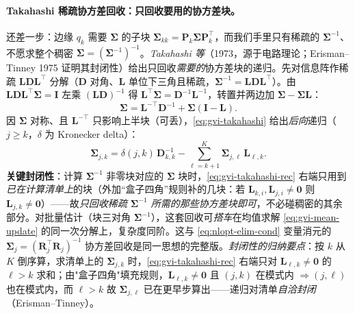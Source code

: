 \paragraph{Takahashi 稀疏协方差回收：只回收要用的协方差块。}
还差一步：边缘 $q_k$ 需要 $\boldsymbol{\Sigma}$ 的子块 $\boldsymbol{\Sigma}_{kk}=\mathbf{P}_k\boldsymbol{\Sigma}\mathbf{P}_k^\top$，而我们手里只有稀疏的 $\boldsymbol{\Sigma}^{-1}$、不愿求整个稠密 $\boldsymbol{\Sigma}=(\boldsymbol{\Sigma}^{-1})^{-1}$。\emph{Takahashi 等}（1973，源于电路理论；Erisman--Tinney 1975 证明其封闭性）给出只回收\emph{需要的}协方差块的递归。先对信息阵作稀疏 $\mathbf{L}\mathbf{D}\mathbf{L}^\top$ 分解（$\mathbf{D}$ 对角、$\mathbf{L}$ 单位下三角且稀疏，$\boldsymbol{\Sigma}^{-1}=\mathbf{L}\mathbf{D}\mathbf{L}^\top$）。由 $\mathbf{L}\mathbf{D}\mathbf{L}^\top\boldsymbol{\Sigma}=\mathbf{I}$ 左乘 $(\mathbf{L}\mathbf{D})^{-1}$ 得 $\mathbf{L}^\top\boldsymbol{\Sigma}=\mathbf{D}^{-1}\mathbf{L}^{-1}$，转置并两边加 $\boldsymbol{\Sigma}-\boldsymbol{\Sigma}\mathbf{L}$：
\begin{equation}
  \boldsymbol{\Sigma}=\mathbf{L}^{-\top}\mathbf{D}^{-1}+\boldsymbol{\Sigma}(\mathbf{I}-\mathbf{L}).
  \label{eq:gvi-takahashi}
\end{equation}
因 $\boldsymbol{\Sigma}$ 对称、且 $\mathbf{L}^{-\top}$ 只影响上半块（可丢），\cref{eq:gvi-takahashi} 给出\emph{后向}递归（$j\ge k$，$\delta$ 为 Kronecker delta）：
\begin{equation}
  \boldsymbol{\Sigma}_{j,k}=\delta(j,k)\,\mathbf{D}_{k,k}^{-1}-\sum_{\ell=k+1}^{K}\boldsymbol{\Sigma}_{j,\ell}\,\mathbf{L}_{\ell,k}.
  \label{eq:gvi-takahashi-rec}
\end{equation}
\textbf{关键封闭性}：计算 $\boldsymbol{\Sigma}^{-1}$ 非零块对应的 $\boldsymbol{\Sigma}$ 块时，\cref{eq:gvi-takahashi-rec} 右端只用到\emph{已在计算清单上}的块（外加“盒子四角”规则补的几块：若 $\mathbf{L}_{k,i},\mathbf{L}_{j,i}\ne\mathbf{0}$ 则 $\mathbf{L}_{j,k}\ne\mathbf{0}$）——故\emph{只回收稀疏 $\boldsymbol{\Sigma}^{-1}$ 所需的那些协方差块即可}，不必碰稠密的其余部分。对批量估计（块三对角 $\boldsymbol{\Sigma}^{-1}$），这套回收可\emph{搭车}在均值求解 \cref{eq:gvi-mean-update} 的同一次分解上，复杂度同阶。这与 \cref{eq:nlopt-elim-cond} 变量消元的 $\boldsymbol{\Sigma}_j=(\mathbf{R}_j^\top\mathbf{R}_j)^{-1}$ 协方差回收是同一思想的完整版。\emph{封闭性的归纳要点}：按 $k$ 从 $K$ 倒序算，求清单上的 $\boldsymbol{\Sigma}_{j,k}$ 时，\cref{eq:gvi-takahashi-rec} 右端只对 $\mathbf{L}_{\ell,k}\ne\mathbf{0}$ 的 $\ell>k$ 求和；由"盒子四角"填充规则，$\mathbf{L}_{\ell,k}\ne\mathbf{0}$ 且 $(j,k)$ 在模式内 $\Rightarrow(j,\ell)$ 也在模式内，而 $\ell>k$ 故 $\boldsymbol{\Sigma}_{j,\ell}$ 已在更早步算出——递归对清单\emph{自洽封闭}（Erisman--Tinney）。

